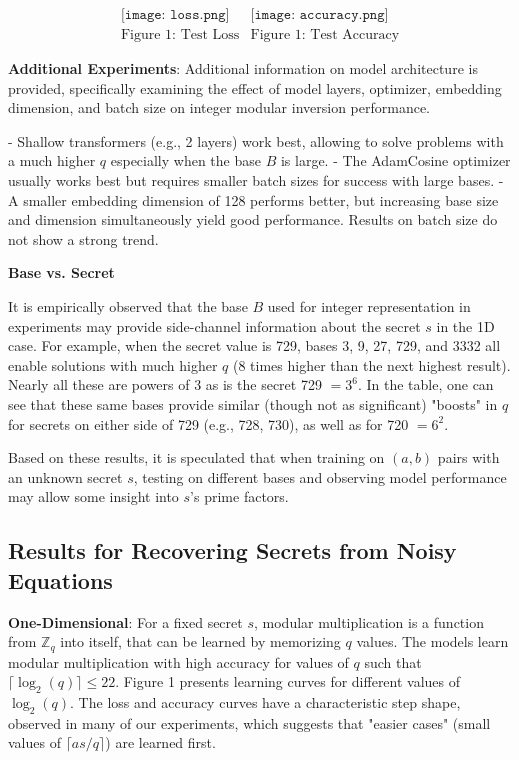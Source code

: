 \documentclass{article}
\begin{document}
\[
\begin{array}{cc}
\texttt{[image: loss.png]} &
\texttt{[image: accuracy.png]} \\
\text{Figure 1: Test Loss} & \text{Figure 1: Test Accuracy}
\end{array}
\]

\textbf{Additional Experiments}: Additional information on model architecture is provided, specifically examining the effect of model layers, optimizer, embedding dimension, and batch size on integer modular inversion performance.

- Shallow transformers (e.g., 2 layers) work best, allowing to solve problems with a much higher \( q \) especially when the base \( B \) is large.
- The AdamCosine optimizer usually works best but requires smaller batch sizes for success with large bases.
- A smaller embedding dimension of 128 performs better, but increasing base size and dimension simultaneously yield good performance. Results on batch size do not show a strong trend.

\textbf{Base vs. Secret}

It is empirically observed that the base \( B \) used for integer representation in experiments may provide side-channel information about the secret \( s \) in the 1D case. For example, when the secret value is 729, bases 3, 9, 27, 729, and 3332 all enable solutions with much higher \( q \) (8 times higher than the next highest result). Nearly all these are powers of 3 as is the secret 729 \( = 3^6 \). In the table, one can see that these same bases provide similar (though not as significant) "boosts" in \( q \) for secrets on either side of 729 (e.g., 728, 730), as well as for 720 \( = 6^2 \).

Based on these results, it is speculated that when training on \( (a, b) \) pairs with an unknown secret \( s \), testing on different bases and observing model performance may allow some insight into \( s \)'s prime factors.

\subsection{Results for Recovering Secrets from Noisy Equations}

\textbf{One-Dimensional}: For a fixed secret \( s \), modular multiplication is a function from \( \mathbb{Z}_q \) into itself, that can be learned by memorizing \( q \) values. The models learn modular multiplication with high accuracy for values of \( q \) such that \( \lceil \log_2(q) \rceil \leq 22 \). Figure 1 presents learning curves for different values of \( \log_2(q) \). The loss and accuracy curves have a characteristic step shape, observed in many of our experiments, which suggests that "easier cases" (small values of \( \lceil as/q \rceil \)) are learned first.
\end{document}
